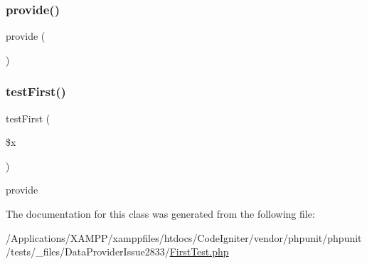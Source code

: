 \subsubsection{\texorpdfstring{provide()}{provide()}}
{\footnotesize\ttfamily provide (\begin{DoxyParamCaption}{ }\end{DoxyParamCaption})}

\mbox{\label{class_foo_1_1_data_provider_issue2833_1_1_first_test_af8ab67a72789da589982c3966d8642ef}} 
\subsubsection{\texorpdfstring{test\+First()}{testFirst()}}
{\footnotesize\ttfamily test\+First (\begin{DoxyParamCaption}\item[{}]{\$x }\end{DoxyParamCaption})}

provide 

The documentation for this class was generated from the following file\+:\begin{DoxyCompactItemize}
\item 
/\+Applications/\+X\+A\+M\+P\+P/xamppfiles/htdocs/\+Code\+Igniter/vendor/phpunit/phpunit/tests/\+\_\+files/\+Data\+Provider\+Issue2833/\mbox{\hyperlink{_data_provider_issue2833_2_first_test_8php}{First\+Test.\+php}}\end{DoxyCompactItemize}
